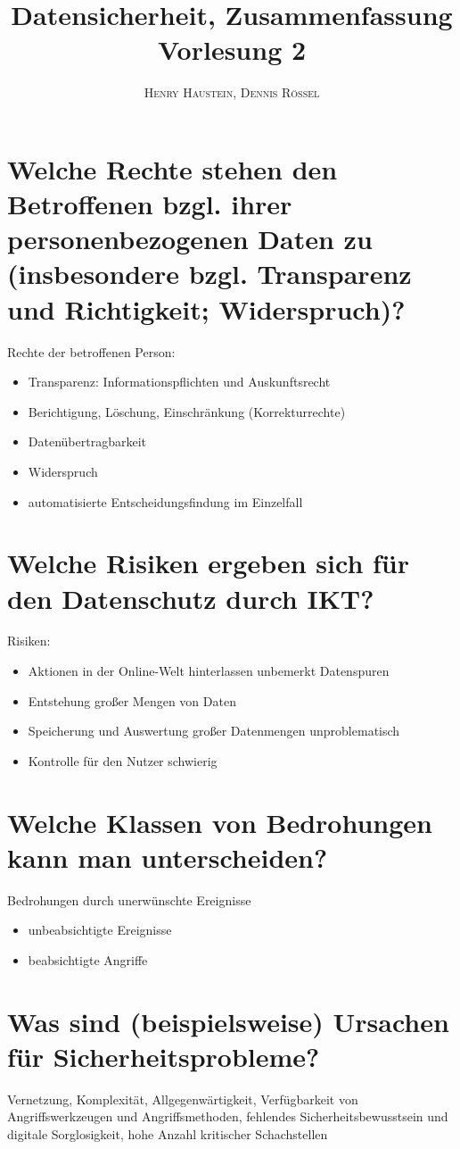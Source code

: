 \documentclass{article}
\title{\textbf{Datensicherheit, Zusammenfassung Vorlesung 2}}
\author{\textsc{Henry Haustein}, \textsc{Dennis Rössel}}
\date{}
\begin{document}
	\maketitle
	
	\section*{Welche Rechte stehen den Betroffenen bzgl. ihrer personenbezogenen Daten zu (insbesondere bzgl. Transparenz und Richtigkeit; Widerspruch)?}
	Rechte der betroffenen Person:
	\begin{itemize}
		\item Transparenz: Informationspflichten und Auskunftsrecht
		\item Berichtigung, Löschung, Einschränkung (Korrekturrechte)
		\item Datenübertragbarkeit
		\item Widerspruch
		\item automatisierte Entscheidungsfindung im Einzelfall
	\end{itemize}
	
	\section*{Welche Risiken ergeben sich für den Datenschutz durch IKT?}
	Risiken:
	\begin{itemize}
		\item Aktionen in der Online-Welt hinterlassen unbemerkt Datenspuren
		\item Entstehung großer Mengen von Daten
		\item Speicherung und Auswertung großer Datenmengen unproblematisch
		\item Kontrolle für den Nutzer schwierig
	\end{itemize}

	\section*{Welche Klassen von Bedrohungen kann man unterscheiden?}
	Bedrohungen durch unerwünschte Ereignisse
	\begin{itemize}
		\item unbeabsichtigte Ereignisse
		\item beabsichtigte Angriffe
	\end{itemize}

	\section*{Was sind (beispielsweise) Ursachen für Sicherheitsprobleme?}
	Vernetzung, Komplexität, Allgegenwärtigkeit, Verfügbarkeit von Angriffswerkzeugen und Angriffsmethoden, fehlendes Sicherheitsbewusstsein und digitale Sorglosigkeit, hohe Anzahl kritischer Schachstellen
\end{document}
